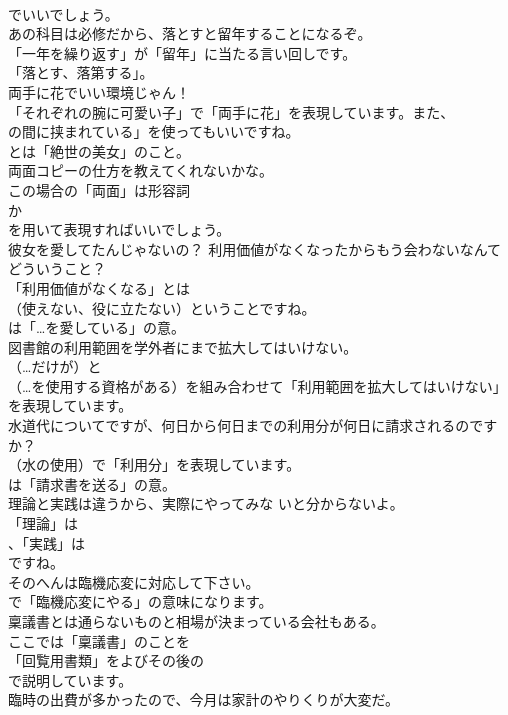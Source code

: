 \documentclass[8pt]{extreport}
\begin{document}
\begin{CJK}{UTF8}{min}
\\	でいいでしょう。	
\\	あの科目は必修だから、落とすと留年することになるぞ。 
\\	「一年を繰り返す」が「留年」に当たる言い回しです。
\\	「落とす、落第する」。	
\\	両手に花でいい環境じゃん！ 
\\	「それぞれの腕に可愛い子」で「両手に花」を表現しています。また、
\\	の間に挟まれている」を使ってもいいですね。
\\	とは「絶世の美女」のこと。	
\\	両面コピーの仕方を教えてくれないかな。 
\\	この場合の「両面」は形容詞
\\	か
\\	を用いて表現すればいいでしょう。	
\\	彼女を愛してたんじゃないの？ 利用価値がなくなったからもう会わないなんてどういうこと？ 
\\	「利用価値がなくなる」とは 
\\	（使えない、役に立たない）ということですね。
\\	は「…を愛している」の意。	
\\	図書館の利用範囲を学外者にまで拡大してはいけない。 
\\	（…だけが）と
\\	（…を使用する資格がある）を組み合わせて「利用範囲を拡大してはいけない」を表現しています。	
\\	水道代についてですが、何日から何日までの利用分が何日に請求されるのですか？ 
\\	（水の使用）で「利用分」を表現しています。
\\	は「請求書を送る」の意。	
\\	理論と実践は違うから、実際にやってみな いと分からないよ。 
\\	「理論」は
\\	、「実践」は
\\	ですね。	
\\	そのへんは臨機応変に対応して下さい。 
\\	で「臨機応変にやる」の意味になります。	
\\	稟議書とは通らないものと相場が決まっている会社もある。 
\\	ここでは「稟議書」のことを
\\	「回覧用書類」をよびその後の
\\	で説明しています。	
\\	臨時の出費が多かったので、今月は家計のやりくりが大変だ。 

\end{CJK}
\end{document}

